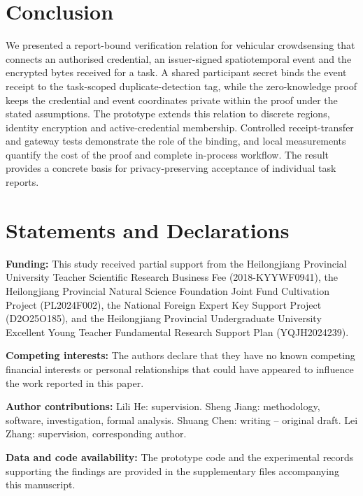 \documentclass[pdflatex,iicol,sn-mathphys-num]{sn-jnl}
\begin{document}
\section{Conclusion}
We presented a report-bound verification relation for vehicular crowdsensing that connects an authorised credential, an issuer-signed spatiotemporal event and the encrypted bytes received for a task. A shared participant secret binds the event receipt to the task-scoped duplicate-detection tag, while the zero-knowledge proof keeps the credential and event coordinates private within the proof under the stated assumptions. The prototype extends this relation to discrete regions, identity encryption and active-credential membership. Controlled receipt-transfer and gateway tests demonstrate the role of the binding, and local measurements quantify the cost of the proof and complete in-process workflow. The result provides a concrete basis for privacy-preserving acceptance of individual task reports.



\section*{Statements and Declarations}
\noindent\textbf{Funding:} This study received partial support from the Heilongjiang Provincial University Teacher Scientific Research Business Fee (2018-KYYWF0941), the Heilongjiang Provincial Natural Science Foundation Joint Fund Cultivation Project (PL2024F002), the National Foreign Expert Key Support Project (D2O25O185), and the Heilongjiang Provincial Undergraduate University Excellent Young Teacher Fundamental Research Support Plan (YQJH2024239).

\noindent\textbf{Competing interests:} The authors declare that they have no known competing financial interests or personal relationships that could have appeared to influence the work reported in this paper.

\noindent\textbf{Author contributions:} Lili He: supervision. Sheng Jiang: methodology, software, investigation, formal analysis. Shuang Chen: writing -- original draft. Lei Zhang: supervision, corresponding author.

\noindent\textbf{Data and code availability:} The prototype code and the experimental records supporting the findings are provided in the supplementary files accompanying this manuscript.
\end{document}
